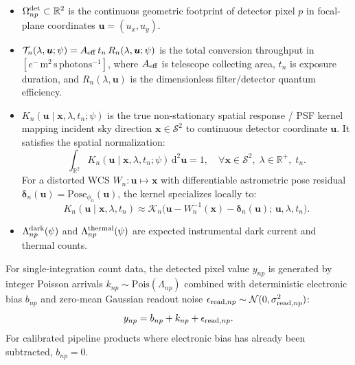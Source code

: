 \documentclass[11pt,a4paper]{article}
\begin{document}
\begin{itemize}
    \item $\Omega_{np}^{\rm det} \subset \mathbb{R}^2$ is the continuous geometric footprint of detector pixel $p$ in focal-plane coordinates $\boldsymbol{u} = (u_x, u_y)$.
    \item $\mathcal{T}_n(\lambda, \boldsymbol{u}; \psi) = A_{\rm eff} \, t_n \, R_n(\lambda, \boldsymbol{u}; \psi)$ is the total conversion throughput in $[e^-\,\mathrm{m^2\,s\,photons^{-1}}]$, where $A_{\rm eff}$ is telescope collecting area, $t_n$ is exposure duration, and $R_n(\lambda, \boldsymbol{u})$ is the dimensionless filter/detector quantum efficiency.
    \item $K_n(\boldsymbol{u} \mid \boldsymbol{x}, \lambda, t_n; \psi)$ is the true non-stationary spatial response / PSF kernel mapping incident sky direction $\boldsymbol{x} \in \mathcal{S}^2$ to continuous detector coordinate $\boldsymbol{u}$. It satisfies the spatial normalization:
    \begin{equation}
    \int_{\mathbb{R}^2} K_n(\boldsymbol{u} \mid \boldsymbol{x}, \lambda, t_n; \psi) \, \mathrm{d}^2\boldsymbol{u} = 1, \quad \forall \boldsymbol{x} \in \mathcal{S}^2, \; \lambda \in \mathbb{R}^+, \; t_n.
    \end{equation}
    For a distorted WCS $W_n: \boldsymbol{u} \mapsto \boldsymbol{x}$ with differentiable astrometric pose residual $\boldsymbol{\delta}_n(\boldsymbol{u}) = \mathrm{Pose}_{\phi_n}(\boldsymbol{u})$, the kernel specializes locally to:
    \begin{equation}
    K_n(\boldsymbol{u} \mid \boldsymbol{x}, \lambda, t_n) \approx \mathcal{K}_n\Big( \boldsymbol{u} - W_n^{-1}(\boldsymbol{x}) - \boldsymbol{\delta}_n(\boldsymbol{u}); \, \boldsymbol{u}, \lambda, t_n \Big).
    \end{equation}
    \item $\Lambda_{np}^{\rm dark}(\psi)$ and $\Lambda_{np}^{\rm thermal}(\psi)$ are expected instrumental dark current and thermal counts.
\end{itemize}

For single-integration count data, the detected pixel value $y_{np}$ is generated by integer Poisson arrivals $k_{np} \sim \mathrm{Pois}(\Lambda_{np})$ combined with deterministic electronic bias $b_{np}$ and zero-mean Gaussian readout noise $\epsilon_{{\rm read}, np} \sim \mathcal{N}(0, \sigma_{{\rm read}, np}^2)$:
\begin{equation}
y_{np} = b_{np} + k_{np} + \epsilon_{{\rm read}, np}.
\end{equation}
For calibrated pipeline products where electronic bias has already been subtracted, $b_{np} = 0$.
\end{document}
